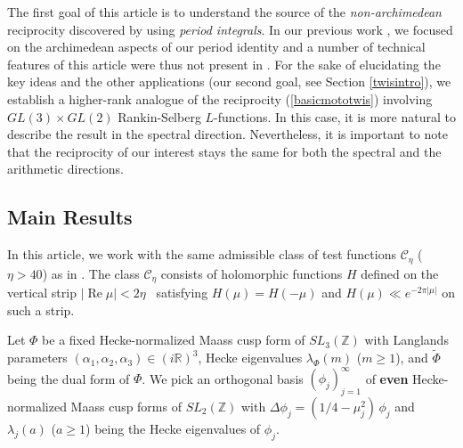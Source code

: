 \documentclass[11pt,reqno]{amsart}
\theoremstyle{definition}
\theoremstyle{definition}
\theoremstyle{remark}
\newcommand{\R}{\ensuremath{\mathbb{R}}}
\newcommand{\Z}{\ensuremath{\mathbb{Z}}}
\numberwithin{equation}{section}
\DeclareMathOperator{\re}{Re}
\begin{document}
 
The first goal of this article is to understand the   source  of the \textit{non-archimedean} reciprocity  discovered by \cite{Y11, BHKM20} using  \textit{period integrals}. In our previous work \cite{Kw23}, we  focused on the archimedean aspects of our period identity   and a number of technical features of this article were thus not present in \cite{Kw23}.  For the sake of elucidating the key ideas and the other applications  (our second goal, see Section \ref{twisintro}),  we establish a higher-rank analogue of the reciprocity (\ref{basicmototwis}) involving  $GL(3)\times GL(2)$ Rankin-Selberg $L$-functions.  In this case, it is more natural to describe the result  in the spectral direction. Nevertheless, it is important to note that the reciprocity of our interest stays the same for both the spectral and the arithmetic directions. 
 



 
 




\subsection{Main Results}  


In this article, we work with the same admissible class of test functions   $\mathcal{C}_{\eta}$ ($\eta>40$) as in \cite{Kw23}.    The class  $\mathcal{C}_{\eta}$ consists of holomorphic functions $H$ defined on the vertical strip  $|\re \mu|< 2\eta$ \ satisfying  	$H(\mu) =   H(-\mu)$  and	$H(\mu)  \ll  e^{-2\pi|\mu|}$ on such a strip. 


Let  $\Phi$ be a fixed Hecke-normalized Maass cusp form of $SL_{3}(\Z)$ with Langlands parameters $(\alpha_{1}, \alpha_{2}, \alpha_{3}) \in (i\R)^3$,  Hecke eigenvalues $\lambda_{\Phi}(m)$ ($m\ge 1$),  and 	$\widetilde{\Phi}$ being  the dual form of $\Phi$. We pick an orthogonal basis  $(\phi_{j})_{j=1}^{\infty}$  of  \textbf{even}  Hecke-normalized  Maass cusp forms of $SL_{2}(\Z)$ with $\Delta\phi_{j}=  ( 1/4-\mu_{j}^2) \, \phi_{j}$ and\,   $\lambda_{j}(a)$  ($a\ge 1$) being the Hecke eigenvalues of $\phi_{j}$.  
\end{document}
